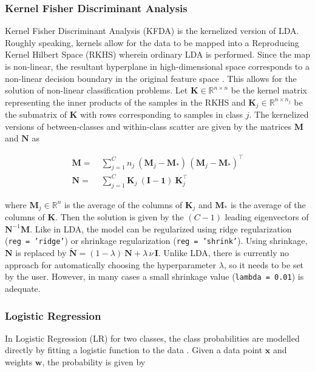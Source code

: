 \documentclass[utf8]{frontiersSCNS} %
\newcommand{\w}{\mathbf{w}}
\newcommand{\x}{\mathbf{x}}
\newcommand{\I}{\mathbf{I}}
\newcommand{\K}{\mathbf{K}}
\newcommand{\M}{\mathbf{M}}
\newcommand{\R}{\mathbb{R}}
\newcommand{\ttt}[1]{\texttt{#1}}
\begin{document}
\subsubsection{Kernel Fisher Discriminant Analysis}

Kernel Fisher Discriminant Analysis (KFDA) is the kernelized version of LDA. Roughly speaking, kernels allow for the data to be mapped into a Reproducing Kernel Hilbert Space (RKHS) wherein ordinary LDA is performed. Since the map is non-linear, the resultant hyperplane in high-dimensional space corresponds to a non-linear decision boundary in the original feature space \citep{Mika1999FisherKernels}. This allows for the solution of non-linear classification problems. Let $\K\in\R^{n\times n}$ be the kernel matrix representing the inner products of the samples in the RKHS and $\K_j\in\R^{n \times n_j}$ be the submatrix of $\K$ with rows corresponding to samples in class $j$. The kernelized versions of between-classes and within-class scatter are given by the matrices $\M$ and $\mathbf{N}$ as


\begin{equation}
\label{eq:kernelFDA}
\begin{alignedat}{2}
\M =\ &  \sum_{j=1}^C n_j\ (\M_j - \M_*)\,(\M_j-\M_*)^\top\\
\mathbf{N} =\ & \sum_{j=1}^C \K_j\ (\mathbf{I} - \mathbf{1})\  \K_j^\top
\end{alignedat}
\end{equation}

where $\M_j\in\R^n$ is the average of the columns of $\K_j$ and $\M_*$ is the average of the columns of $\K$. Then the solution is given by the $(C-1)$ leading eigenvectors of $\mathbf{N}^{-1} \mathbf{M}$. 
Like in LDA, the model can be regularized using ridge regularization (\ttt{reg = 'ridge'}) or shrinkage regularization (\ttt{reg = 'shrink'}). Using shrinkage, $\mathbf{N}$ is replaced by $\widetilde{\mathbf{N}} = (1-\lambda)\ \mathbf{N} + \lambda\,\nu\,\I$. Unlike LDA, there is currently no approach for automatically choosing the hyperparameter $\lambda$, so it needs to be set by the user. However, in many cases a small shrinkage value (\ttt{lambda = 0.01}) is adequate.

\subsubsection{Logistic Regression}

In Logistic Regression (LR) for two classes, the class probabilities are modelled directly by fitting a logistic function to the data \citep{Hastie2009}. Given a data point $\x$ and weights $\w$, the probability is given by
\end{document}
